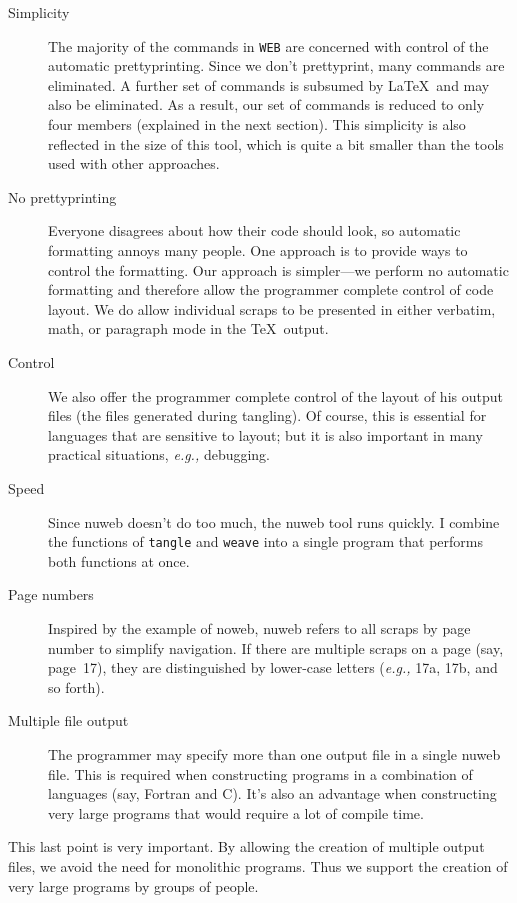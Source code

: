 \documentclass{report}
\begin{document}
\begin{description}
\item[Simplicity] The majority of the commands in \verb|WEB| are
  concerned with control of the automatic prettyprinting. Since we
  don't prettyprint, many commands are eliminated. A further set of
  commands is subsumed by \LaTeX\  and may also be eliminated. As a
  result, our set of commands is reduced to only four members (explained
  in the next section). This simplicity is also reflected in
  the size of this tool, which is quite a bit smaller than the tools
  used with other approaches.
\item[No prettyprinting] Everyone disagrees about how their code
  should look, so automatic formatting annoys many people. One approach
  is to provide ways to control the formatting. Our approach is
  simpler---we perform no automatic formatting and therefore allow the
  programmer complete control of code layout.
  We do allow individual scraps to be presented in either verbatim,
  math, or paragraph mode in the \TeX\ output.
\item[Control] We also offer the programmer complete control of the
  layout of his output files (the files generated during tangling). Of
  course, this is essential for languages that are sensitive to layout;
  but it is also important in many practical situations, {\em e.g.,}
  debugging.
\item[Speed] Since nuweb doesn't do too much, the nuweb tool runs
  quickly. I combine the functions of \verb|tangle| and \verb|weave| into
  a single program that performs both functions at once.
\item[Page numbers] Inspired by the example of noweb, nuweb refers to
  all scraps by page number to simplify navigation. If there are
  multiple scraps on a page (say, page~17), they are distinguished by
  lower-case letters ({\em e.g.,} 17a, 17b, and so forth).
\item[Multiple file output] The programmer may specify more than one
  output file in a single nuweb file. This is required when constructing
  programs in a combination of languages (say, Fortran and C)\@. It's also
  an advantage when constructing very large programs that would require
  a lot of compile time.
\end{description}
This last point is very important. By allowing the creation of
multiple output files, we avoid the need for monolithic programs.
Thus we support the creation of very large programs by groups of
people. 
\end{document}
